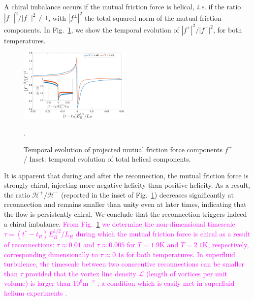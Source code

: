 \documentclass[%
 reprint,
 amsmath,amssymb,
 aps,
 prl,
]{revtex4-2}
\def\magenta#1{\textcolor{magenta}{#1}}
\begin{document}
{A chiral imbalance occurs if the mutual friction force is helical, 
\textit{i.e.} if the ratio $|f^+|^2/|f^-|^2 \neq 1$, with $|f^\pm|^2$ the total squared norm of the mutual friction components. 
In Fig.~\ref{fig:mutual-friction-decomp}, we show the temporal evolution of $|f^+|^2/|f^-|^2$, for both temperatures. 
%
\begin{figure}[h!]
    \centering
    \includegraphics*[width=0.48\textwidth]{fmfDecompFig.pdf}
    \caption{Temporal evolution of projected mutual friction force components $f^\pm$/ Inset: temporal evolution of total helical components.}.
    \label{fig:mutual-friction-decomp}
\end{figure}
%
It is apparent
that during and after the reconnection, the mutual friction force is strongly chiral,
injecting more negative helicity than positive helicity. 
As a result, the ratio $\mathcal{H}^+/\mathcal{H}^-$ 
(reported in the inset of Fig.~\ref{fig:mutual-friction-decomp}) 
decreases significantly at reconnection and remains smaller than unity even at later times, 
indicating that the flow is persistently chiral. We conclude that the reconnection triggers indeed a chiral imbalance.
\magenta{From Fig.~\ref{fig:mutual-friction-decomp} we determine the non-dimensional timescale $\tau = (t^*-t_R)E_R^{1/2}/L_R$
during which the mutual friction force is chiral as a result of reconnections: $\tau \approx 0.01$ and $\tau \approx 0.005$
for $T=1.9$K and $T=2.1$K, respectively, corresponding dimensionally to $\tau \approx 0.1$s for both temperatures. 
In superfluid turbulence, the timescale between two consecutive reconnections can be smaller than $\tau$ provided that the
vortex line density $\mathcal{L}$ (length of vortices per unit volume) is larger than $10^8 \text{m}^{-2}$ \cite{stasiak2024quantum,barenghi2004},
a condition which is easily met in superfluid helium experiments \cite{roche2007,Babuin2014}.}




}
\end{document}
